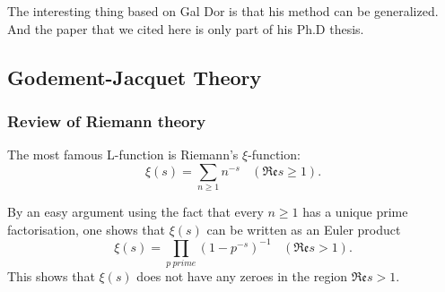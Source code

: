 \documentclass[12pt,a4paper,english]{article}
\theoremstyle{plain}
\theoremstyle{definition}
\begin{document}
The interesting thing based on Gal Dor is that his method can be generalized. And the paper that we cited here is only part of his Ph.D thesis.
\subsection{Godement-Jacquet Theory}
\subsubsection{Review of Riemann theory}
The most famous L-function is Riemann's $\xi$-function:
\begin{equation*}
    \xi(s)=\sum_{n\geq 1}n^{-s}\ \ \ \ (\mathfrak{Re}s\geq 1).
\end{equation*}

By an easy argument using the fact that every $n\geq 1$ has a unique prime factorisation, one shows that $\xi(s)$ can be written as an Euler product
\begin{equation*}
    \xi(s)=\prod_{p\ prime} (1-p^{-s})^{-1}\ \ \ \ (\mathfrak{Re}s >1).
\end{equation*}
This shows that $\xi(s)$ does not have any zeroes in the region $\mathfrak{Re}s >1$.
\end{document}
